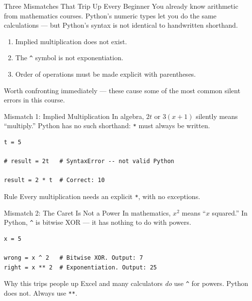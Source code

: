 \documentclass[9pt,aspectratio=169,xcolor=table]{beamer}
\begin{document}
\begin{frame}{Three Mismatches That Trip Up Every Beginner}
    \leavevmode
    You already know arithmetic from mathematics courses. Python's
    numeric types let you do the same calculations --- but Python's
    \alert{syntax} is not identical to handwritten shorthand.

    \vspace{3mm}
    \begin{enumerate}
        \item Implied multiplication does not exist.
        \item The \texttt{\^{}} symbol is not exponentiation.
        \item Order of operations must be made explicit with parentheses.
    \end{enumerate}

    \vspace{3mm}
    {\small Worth confronting immediately --- these cause some of the
    most common silent errors in this course.}
\end{frame}

\begin{frame}[fragile]{Mismatch 1: Implied Multiplication}
    \leavevmode
    In algebra, $2t$ or $3(x+1)$ silently means ``multiply.'' Python has
    \alert{no such shorthand}: \texttt{*} must always be written.

\begin{lstlisting}
t = 5

# result = 2t   # SyntaxError -- not valid Python

result = 2 * t  # Correct: 10
\end{lstlisting}

    \vspace{2mm}
    \begin{alertblock}{Rule}
        Every multiplication needs an explicit \texttt{*}, with no
        exceptions.
    \end{alertblock}
\end{frame}

\begin{frame}[fragile]{Mismatch 2: The Caret Is Not a Power}
    \leavevmode
    In mathematics, $x^2$ means ``$x$ squared.'' In Python, \texttt{\^{}}
    is \alert{bitwise XOR} --- it has nothing to do with powers.

\begin{lstlisting}
x = 5

wrong = x ^ 2   # Bitwise XOR. Output: 7
right = x ** 2  # Exponentiation. Output: 25
\end{lstlisting}

    \vspace{2mm}
    \begin{alertblock}{Why this trips people up}
        Excel and many calculators \emph{do} use \texttt{\^{}} for
        powers. Python does not. Always use \texttt{**}.
    \end{alertblock}
\end{frame}
\end{document}
